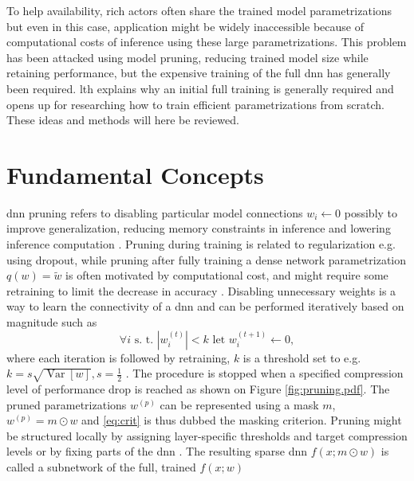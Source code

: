 \documentclass[12pt,fleqn,twocolumn]{article}
\newcommand{\half}{\ensuremath{\frac{1}{2}}}
\begin{document}
To help availability, rich actors often share the trained model parametrizations but even in this case, application might be widely inaccessible because of computational costs of inference using these large parametrizations.
This problem has been attacked using model pruning, reducing trained model size while retaining performance, but the expensive training of the full \acrshort{dnn} has generally been required.
\acrshort{lth} explains why an initial full training is generally required and opens up for researching how to train efficient parametrizations from scratch.
These ideas and methods will here be reviewed.

\section*{Fundamental Concepts}%
\acrshort{dnn} pruning refers to disabling particular model connections $w_i \leftarrow 0$ possibly to improve generalization, reducing memory constraints in inference and lowering inference computation \cite{LeCun1989OptimalBD}.
Pruning during training is related to regularization e.g. using dropout, while pruning after fully training a dense network parametrization $q(w)=\tilde w$ is often motivated by computational cost, and might require some retraining to limit the decrease in accuracy \cite{lange2020lth}.
Disabling unnecessary weights is a way to learn the connectivity of a \acrshort{dnn} and can be performed iteratively based on magnitude such as 
\begin{equation}\label{eq:crit}
    \forall i \text{ s. t. } |w_i^{(t)}|<k \text{ let } w_i^{(t+1)} \leftarrow 0,
\end{equation}
where each iteration is followed by retraining, $k$ is a threshold set to e.g. $k=s\sqrt{\operatorname{Var}[w]}, s=\half$ \cite{han2015learning, nzmora2019distiller}. 
The procedure is stopped when a specified compression level of performance drop is reached \cite{han2015learning} as shown on Figure \ref{fig:pruning.pdf}.
The pruned parametrizations $w^{(p)}$ can be represented using a mask $m$, $w^{(p)} = m \odot w$ and \eqref{eq:crit} is thus dubbed the masking criterion.
Pruning might be structured locally by assigning layer-specific thresholds and target compression levels or by fixing parts of the \acrshort{dnn} \cite{han2015learning}.
The resulting sparse \acrshort{dnn} $f(x;m\odot w)$ is called a subnetwork of the full, trained $f(x;w)$
\end{document}
